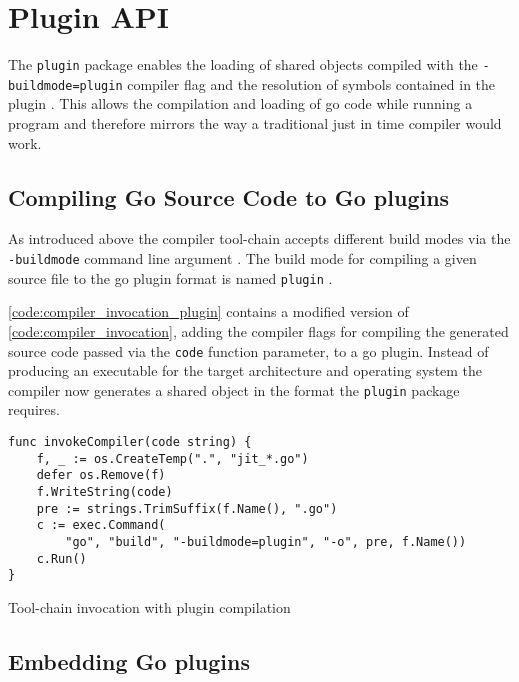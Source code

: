 \chapter{Plugin API}
\label{chapter:plugin-api}

The \texttt{plugin} package enables the loading of shared objects compiled with
the \newline \texttt{-buildmode=plugin} compiler flag and the resolution of
symbols contained in the plugin \cite[Overview]{go_plugin}. This allows the
compilation and loading of go code while running a program and therefore
mirrors the way a traditional just in time compiler would work.

\section{Compiling Go Source Code to Go plugins}

As introduced above the compiler tool-chain accepts different build modes via
the \texttt{-buildmode} command line argument \cite{go_build_mode}. The build
mode for compiling a given source file to the go plugin format is named
\texttt{plugin} \cite{go_build_mode} \cite[Overview]{go_plugin}.

\autoref{code:compiler_invocation_plugin} contains a modified version of
\autoref{code:compiler_invocation}, adding the compiler flags for compiling the
generated source code passed via the \texttt{code} function parameter, to a go
plugin. Instead of producing an executable for the target architecture and
operating system the compiler now generates a shared object in the format the
\texttt{plugin} package requires.

\begin{listing}[H]
    \begin{verbatim}
func invokeCompiler(code string) {
    f, _ := os.CreateTemp(".", "jit_*.go")
    defer os.Remove(f)
    f.WriteString(code)
    pre := strings.TrimSuffix(f.Name(), ".go")
    c := exec.Command(
        "go", "build", "-buildmode=plugin", "-o", pre, f.Name())
    c.Run()
}
    \end{verbatim}
    \caption{Tool-chain invocation with plugin compilation}
    \label{code:compiler_invocation_plugin}
\end{listing}

\section{Embedding Go plugins}

